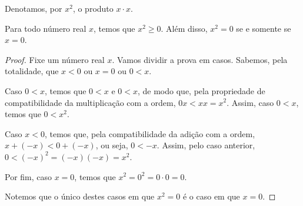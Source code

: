 Denotamos, por $x^2$, o produto $x\cdot x$.

\begin{proposition}
    Para todo número real $x$, temos que $x^2\geq 0$.
    Além disso, $x^2=0$ se e somente se $x=0$.
\end{proposition}
\begin{proof}
    Fixe um número real $x$.
    Vamos dividir a prova em casos.
    Sabemos, pela totalidade, que $x<0$ ou $x=0$ ou $0<x$.

    Caso $0<x$, temos que $0<x$ e $0<x$, de modo que, pela propriedade de compatibilidade da multiplicação com a ordem, $0x <xx=x^2$.
    Assim, caso $0<x$, temos que $0<x^2$.

    Caso $x<0$, temos que, pela compatibilidade da adição com a ordem, $x+(-x)<0+(-x)$, ou seja, $0<-x$.
    Assim, pelo caso anterior, $0<(-x)^2=(-x)(-x)=x^2$.

    Por fim, caso $x=0$, temos que $x^2=0^2=0\cdot 0=0$.

    Notemos que o único destes casos em que $x^2=0$ é o caso em que $x=0$.
\end{proof}

